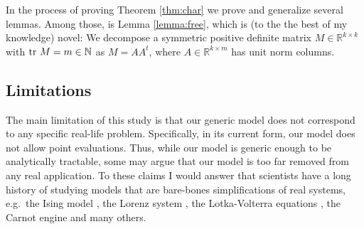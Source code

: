 In the process of proving Theorem \ref{thm:char} we prove and
generalize several lemmas. Among those, is Lemma \ref{lemma:free},
which is (to the the best of my knowledge) novel: We decompose a
symmetric positive definite matrix \(M \in \mathbb{R}^{k \times k}\)
with \(\textup{tr}\ M = m \in \mathbb{N}\) as \(M = AA^t\), where \(A\in
\mathbb{R}^{k \times m}\) has unit norm columns.


\subsection{Limitations}\label{subsec:limitations}
The main limitation of this study is that our generic model does not
correspond to any specific real-life problem. Specifically, in its
current form, our model does not allow point evaluations. Thus, while
our model is generic enough to be analytically tractable, some may
argue that our model is too far removed from any real application. To
these claims I would answer that scientists have a long history of
studying models that are bare-bones simplifications of real systems,
e.g.~the Ising model \cite{cipra1987}, the Lorenz system \cite{brin},
the Lotka-Volterra equations \cite{logan2006}, the Carnot engine
\cite{kardar2007} and many others.
